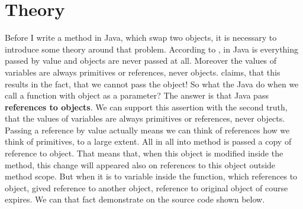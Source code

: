 \documentclass[5pt]{article}
\begin{document}
\maketitle

\section{Theory}
Before I write a method in Java, which swap two objects, it is necessary
to introduce some theory around that problem. According to \cite{java:jon}, in
Java is everything passed by value and objects are never passed at all. Moreover
the values of variables are always primitives or references, never objects.
\cite{java:jon} claims, that this results in the fact, that we cannot pass the
object! So what the Java do when we call a function with object as a parameter?
The answer is that Java pass \textbf{references to objects}. We can support this
assertion with the second truth, that the values of variables are always
primitives or references, never objects. Passing a reference by value actually
means we can think of references how we think of primitives, to a large extent.
All in all into method is passed a copy of reference to object. That means that,
when this object is modified inside the method, this change will appeared also
on references to this object outside method scope. But when it is to variable
inside the function, which references to object, gived reference to another
object, reference to original object of course expires. We can that fact
demonstrate on the source code shown below.
\end{document}
